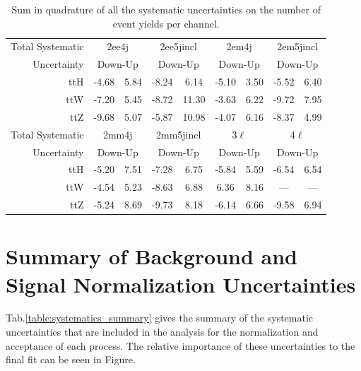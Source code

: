 \begin{table}
\begin{center}
\begin{tabular}{r|cc|cc|cc|cc|}
Total Systematic & \multicolumn{2}{c|}{2ee4j} & \multicolumn{2}{c|}{2ee5jincl} & \multicolumn{2}{c|}{2em4j} & \multicolumn{2}{c|}{2em5jincl} \\ 
Uncertainty & \multicolumn{2}{c|}{Down-Up} & \multicolumn{2}{c|}{Down-Up} & \multicolumn{2}{c|}{Down-Up} & \multicolumn{2}{c|}{Down-Up} \\ 
\hline 
ttH & -4.68 & 5.84 & -8.24 & 6.14 & -5.10 & 3.50 & -5.52 & 6.40   \\ 
ttW & -7.20 & 5.45 & -8.72 & 11.30 & -3.63 & 6.22 & -9.72 & 7.95 \\ 
ttZ & -9.68 & 5.07 & -5.87 & 10.98 & -4.07 & 6.16 & -8.37 & 4.99 \\ 
\hline 
Total Systematic & \multicolumn{2}{c|}{2mm4j}& \multicolumn{2}{c|}{2mm5jincl} & \multicolumn{2}{c|}{3$\ell$} & \multicolumn{2}{c|}{4$\ell$} \\ 
Uncertainty & \multicolumn{2}{c|}{Down-Up} &\multicolumn{2}{c|}{Down-Up} & \multicolumn{2}{c|}{Down-Up} & \multicolumn{2}{c|}{Down-Up} \\ 
\hline 
ttH &-5.20 & 7.51& -7.28 & 6.75 & -5.84 & 5.59 & -6.54 & 6.54\\ 
ttW &-4.54 & 5.23& -8.63 & 6.88 &  6.36 & 8.16 & --- & --- \\ 
ttZ &-5.24 & 8.69& -9.73 & 8.18 & -6.14 & 6.66 & -9.58 & 6.94\\ 
\end{tabular} 
\caption{Sum in quadrature of all the systematic uncertainties on the number of event yields per channel.}
\label{table:systematics_total_detector} 
\end{center} 
\end{table} 


\section{Summary of Background and Signal Normalization Uncertainties}

Tab.\ref{table:systematics_summary} gives the summary of the systematic uncertainties that are included in the analysis for the normalization and acceptance of each process. The relative importance of these uncertainties to the final fit can be seen in Figure. 


